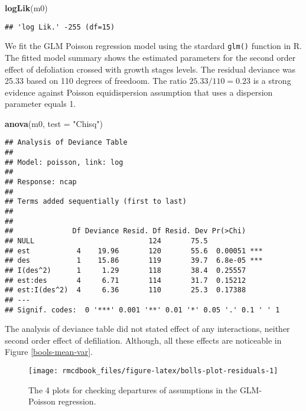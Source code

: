 \documentclass[9pt,a5paper,]{book}
\newenvironment{Shaded}{}{}
\newcommand{\KeywordTok}[1]{\textbf{{#1}}}
\newcommand{\DataTypeTok}[1]{\underline{{#1}}}
\newcommand{\StringTok}[1]{{#1}}
\newcommand{\NormalTok}[1]{{#1}}
\renewenvironment{Shaded}{\color{inputcolor}}{}
\renewcommand{\DataTypeTok}[1]{{#1}}
\theoremstyle{definition}
\theoremstyle{definition}
\theoremstyle{remark}
\begin{document}
\begin{Shaded}
\begin{Highlighting}[]
\KeywordTok{logLik}\NormalTok{(m0)}
\end{Highlighting}
\end{Shaded}

\begin{verbatim}
## 'log Lik.' -255 (df=15)
\end{verbatim}

We fit the GLM Poisson regression model using the stardard
\texttt{glm()} function in R. The fitted model summary shows the
estimated parameters for the second order effect of defoliation crossed
with growth stages levels. The residual deviance was 25.33 based on 110
degrees of freedoom. The ratio \(25.33/110 = 0.23\) is a strong evidence
against Poisson equidispersion assumption that uses a dispersion
parameter equals 1.

\begin{Shaded}
\begin{Highlighting}[]
\KeywordTok{anova}\NormalTok{(m0, }\DataTypeTok{test =} \StringTok{"Chisq"}\NormalTok{)}
\end{Highlighting}
\end{Shaded}

\begin{verbatim}
## Analysis of Deviance Table
## 
## Model: poisson, link: log
## 
## Response: ncap
## 
## Terms added sequentially (first to last)
## 
## 
##              Df Deviance Resid. Df Resid. Dev Pr(>Chi)    
## NULL                           124       75.5             
## est           4    19.96       120       55.6  0.00051 ***
## des           1    15.86       119       39.7  6.8e-05 ***
## I(des^2)      1     1.29       118       38.4  0.25557    
## est:des       4     6.71       114       31.7  0.15212    
## est:I(des^2)  4     6.36       110       25.3  0.17388    
## ---
## Signif. codes:  0 '***' 0.001 '**' 0.01 '*' 0.05 '.' 0.1 ' ' 1
\end{verbatim}

The analysis of deviance table did not stated effect of any
interactions, neither second order effect of defiliation. Although, all
these effects are noticeable in Figure \ref{bools-mean-var}.

\begin{figure}[h]

{\centering \texttt{[image: rmcdbook\_files/figure-latex/bolls-plot-residuals-1]} 

}

\caption{The 4 plots for checking departures of assumptions in the GLM-Poisson regression.}\label{fig:bolls-plot-residuals}
\end{figure}
\end{document}
